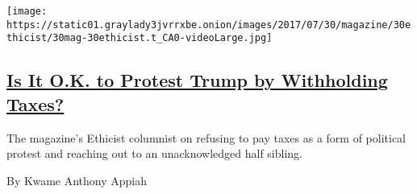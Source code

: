 \begin{enumerate}
  \texttt{[image: https://static01.graylady3jvrrxbe.onion/images/2017/07/30/magazine/30ethicist/30mag-30ethicist.t\_CA0-videoLarge.jpg]}

  \hypertarget{is-it-ok-to-protest-trump-by-withholding-taxes}{%
  \subsection{\texorpdfstring{\href{/2017/07/26/magazine/is-it-ok-to-protest-trump-by-withholding-taxes.html}{Is
  It O.K. to Protest Trump by Withholding
  Taxes?}}{Is It O.K. to Protest Trump by Withholding Taxes?}}\label{is-it-ok-to-protest-trump-by-withholding-taxes}}

  The magazine's Ethicist columnist on refusing to pay taxes as a form
  of political protest and reaching out to an unacknowledged half
  sibling.

  By Kwame Anthony Appiah
\end{enumerate}

